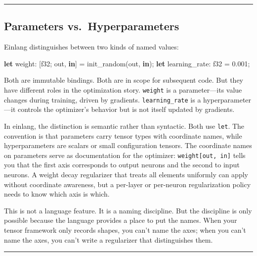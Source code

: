 \documentclass[11pt,]{article}
\newenvironment{Shaded}{}{}
\newcommand{\DataTypeTok}[1]{\textcolor[rgb]{0.56,0.13,0.00}{#1}}
\newcommand{\DecValTok}[1]{\textcolor[rgb]{0.25,0.63,0.44}{#1}}
\newcommand{\KeywordTok}[1]{\textcolor[rgb]{0.00,0.44,0.13}{\textbf{#1}}}
\newcommand{\NormalTok}[1]{#1}
\newcommand{\OperatorTok}[1]{\textcolor[rgb]{0.40,0.40,0.40}{#1}}
\begin{document}
\begin{center}\rule{0.5\linewidth}{0.4pt}\end{center}

\hypertarget{parameters-vs.hyperparameters}{%
\subsection{Parameters
vs.~Hyperparameters}\label{parameters-vs.hyperparameters}}

Einlang distinguishes between two kinds of named values:

\begin{Shaded}
\begin{Highlighting}[]
\KeywordTok{let}\NormalTok{ weight: }\OperatorTok{[}\DataTypeTok{f32}\NormalTok{; out, }\KeywordTok{in}\OperatorTok{]}\NormalTok{ = init_random(out, }\KeywordTok{in}\NormalTok{);}
\KeywordTok{let}\NormalTok{ learning_rate: }\DataTypeTok{f32}\NormalTok{ = }\DecValTok{0.001}\NormalTok{;}
\end{Highlighting}
\end{Shaded}

Both are immutable bindings. Both are in scope for subsequent code. But
they have different roles in the optimization story. \texttt{weight} is
a parameter---its value changes during training, driven by gradients.
\texttt{learning\_rate} is a hyperparameter---it controls the
optimizer's behavior but is not itself updated by gradients.

In einlang, the distinction is semantic rather than syntactic. Both use
\texttt{let}. The convention is that parameters carry tensor types with
coordinate names, while hyperparameters are scalars or small
configuration tensors. The coordinate names on parameters serve as
documentation for the optimizer: \texttt{weight{[}out,\ in{]}} tells you
that the first axis corresponds to output neurons and the second to
input neurons. A weight decay regularizer that treats all elements
uniformly can apply without coordinate awareness, but a per-layer or
per-neuron regularization policy needs to know which axis is which.

This is not a language feature. It is a naming discipline. But the
discipline is only possible because the language provides a place to put
the names. When your tensor framework only records shapes, you can't
name the axes; when you can't name the axes, you can't write a
regularizer that distinguishes them.

\begin{center}\rule{0.5\linewidth}{0.4pt}\end{center}
\end{document}
